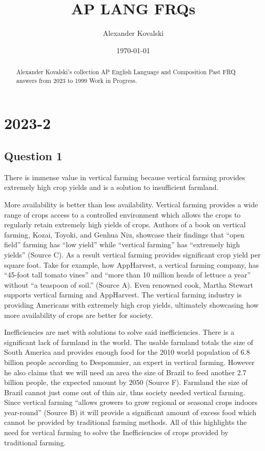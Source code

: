 \documentclass[10pt]{article}
\title{AP LANG FRQs}
\author{Alexander Kovalski}
\date{\today}
\begin{document}
\maketitle

\begin{abstract}

Alexander Kovalski's collection AP English Language and Composition Past FRQ answers from 2023 to 1999 Work in Progress.

\end{abstract}

\tableofcontents

\section{2023-2}

\subsection{Question 1}

There is immense value in vertical farming because vertical farming provides extremely high crop yields and is a solution to insufficient farmland.

More availability is better than less availability. Vertical farming provides a wide range of crops access to a controlled environment which allows the crops to regularly retain extremely high yields of crops. Authors of a book on vertical farming, Kozai, Toyoki, and Genhua Niu, showcase their findings that “open field” farming has “low yield” while “vertical farming” has “extremely high yields” (Source C). As a result vertical farming provides significant crop yield per square foot. Take for example, how AppHarvest, a vertical farming company, has “45-foot tall tomato vines” and “more than 10 million heads of lettuce a year” without “a teaspoon of soil.” (Source A). Even renowned cook, Martha Stewart supports vertical farming and AppHarvest. The vertical farming industry is providing Americans with extremely high crop yields, ultimately showcasing how more availability of crops are better for society.

Inefficiencies are met with solutions to solve said inefficiencies. There is a significant lack of farmland in the world. The usable farmland totals the size of South America and provides enough food for the 2010 world population of 6.8 billion people according to Despommier, an expert in vertical farming. However he also claims that we will need an area the size of Brazil to feed another 2.7 billion people, the expected amount by 2050 (Source F). Farmland the size of Brazil cannot just come out of thin air, thus society needed vertical farming. Since vertical farming “allows growers to grow regional or seasonal crops indoors year-round” (Source B) it will provide a significant amount of excess food which cannot be provided by traditional farming methods. All of this highlights the need for vertical farming to solve the Inefficiencies of crops provided by traditional farming.
\end{document}
